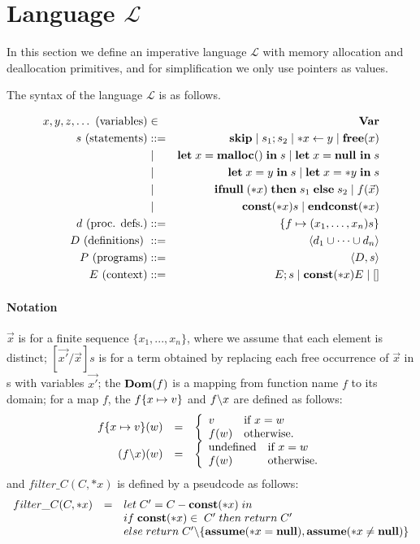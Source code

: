 \section{Language \(\mathcal{L}\)}\label{sec:language}
In this section we define an imperative language \(\mathcal{L}\) with
memory allocation and deallocation primitives, and for simplification
we only use pointers as values.

The syntax of the language \(\mathcal{L}\) is as follows.

\begin{eqnarray*}
  x,y,z,\dots \mbox{ (variables)} &\in& \mathbf{Var}\\
  s \mbox{ (statements)} & ::= &  \mathbf{skip} \mid s_{1};s_{2} \mid *x \leftarrow y \mid \mathbf{free}(x) \\
  & \mid & \mathbf{let}\; x = \mathbf{malloc()}\; \mathbf{in}\; s \mid \mathbf{let}\; x = \mathbf{null}\ \mathbf{in}\; s  \\
  & \mid & \mathbf{let}\; x = y \; \mathbf{in}\; s \mid   \mathbf{let}\; x = *y \; \mathbf{in}\; s \\
  & \mid & \mathbf{ifnull}\;(*x) \; \mathbf{then}\; s_{1}\; \mathbf{else}\; s_{2} \mid f(\vec{x})\\
  & \mid & \mathbf{const}(*x) s \mid \mathbf{endconst}(*x)  \\
  d \mbox{ (proc. defs.)} & ::= & \{f \mapsto (x_1,\dots,x_n)s\}\\
  D \mbox{ (definitions) } &::=& \langle d_1 \cup \dots \cup d_n \rangle\\
  P \mbox{ (programs)} &::=& \langle D, s \rangle\\
  E \mbox{ (context)} &::=& E;s \mid \mathbf{const}(*x) E \mid [ ] 
\end{eqnarray*}

\paragraph{Notation} \(\vec{x}\) is for a finite sequence \(\{x_1,...,x_n\}\),
where we assume that each element is distinct; \([\vec{x'}/\vec{x}]s\)
is for a term obtained by replacing each free occurrence of
\(\vec{x}\) in s with variables \(\vec{x'}\); the \(\mathbf{Dom}(f)\) is a
mapping from function name \(f\) to its domain; for a map \(f\), the
\(f \{x \mapsto v\}\) and \( f \backslash x\) are defined as follows:
\[
\begin{array}{rcl}
f \{x \mapsto v\} (w) &=&
\left\{
\begin{array}{ll}
v & \mbox{if \(x = w\)}\\
f(w) & \mbox{otherwise.}
\end{array}
\right.\\
(f \backslash x)(w) &=&
\left\{
\begin{array}{ll}
\mbox{undefined} & \mbox{if \(x = w\)}\\
f(w) & \mbox{otherwise.}
\end{array}
\right.
\end{array}
\]
and \(filter\_C(C, *x)\) is defined by a pseudcode as follows:
\[
\begin{array}{lcl}
  filter\_C(C, *x) &=& let \; C' = C - \mathbf{const}(*x) \; in \\
  & & if \; \mathbf{const}(*x) \in \; C'\; then \; return \; C'\\
  & & else \; return \; C'\backslash\{\mathbf{assume}(*x = \mathbf{null}),\mathbf{assume}(*x \ne \mathbf{null})\}
\end{array}
\]


